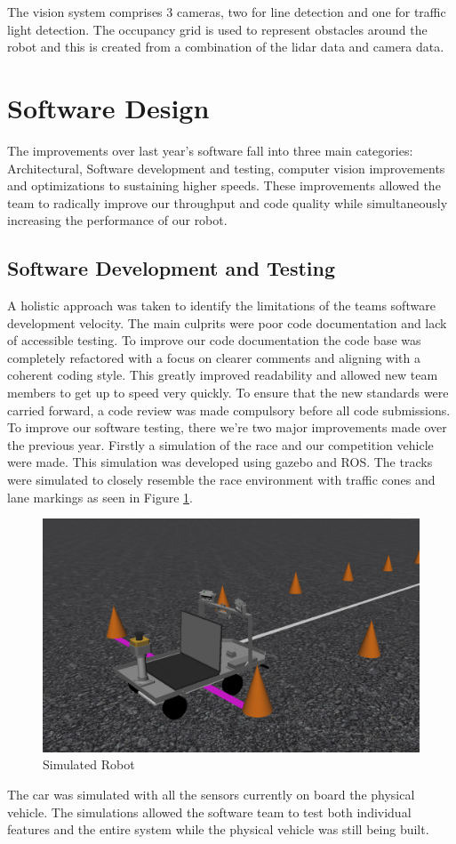 \documentclass[11pt,journal]{IEEEtran}
\begin{document}
The vision system comprises 3 cameras, two for line detection and one for traffic light detection. The occupancy grid is used to represent obstacles around the robot and this is created from a combination of the lidar data and camera data.

\section{Software Design}
The improvements over last year's software fall into three main categories: Architectural, Software development and testing, computer vision improvements and optimizations to sustaining higher speeds. These improvements allowed the team to radically improve our throughput and code quality while simultaneously increasing the performance of our robot.

\subsection{Software Development and Testing}
A holistic approach was taken to identify the limitations of the teams software development velocity. The main culprits were poor code documentation and lack of accessible testing.
To improve our code documentation the code base was completely refactored with a focus on clearer comments and aligning with a coherent coding style. This greatly improved readability and allowed new team members to get up to speed very quickly. To ensure that the new standards were carried forward, a code review was made compulsory before all code submissions.
To improve our software testing, there we're two major improvements made over the previous year. Firstly a simulation of the race and our competition vehicle were made. This simulation was developed using gazebo and ROS. The tracks were simulated to closely resemble the race environment with traffic cones and lane markings as seen in Figure \ref{Sim_Robot}.
\begin{figure}[ht]
\centerline{\includegraphics[width=0.9\columnwidth]{simulated_robot.png}}
\caption{Simulated Robot}
\label{Sim_Robot}
\end{figure}
The car was simulated with all the sensors currently on board the physical vehicle. The simulations allowed the software team to test both individual features and the entire system while the physical vehicle was still being built.
\end{document}

